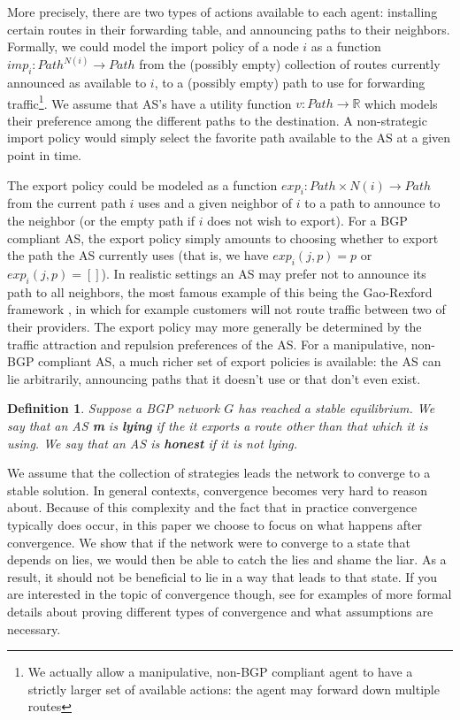 \documentclass[10pt]{article}
\newcommand{\R}{\mathbb{R}}
\newtheorem{definition}{Definition}
\begin{document}
    More precisely, there are two types of actions available to each agent:
    installing certain routes in their forwarding table,
    and announcing paths to their neighbors.
    Formally, we could model the import policy of a node $i$ as a function
    $imp_i : Path^{N(i)} \to Path$ from the (possibly empty) collection of
    routes currently announced as available to $i$, to a (possibly empty) path
    to use for forwarding traffic\footnote{
      We actually allow a manipulative, non-BGP compliant agent to have a
      strictly larger set of available actions: the agent may forward down
      multiple routes
    }. We assume that AS's have a utility function $v : Path \to \R$
    which models their preference among the different paths to the destination.
    A non-strategic import policy would simply select the favorite
    path available to the AS at a given point in time.

    The export policy could be modeled as a function
    $exp_i : Path\times N(i) \to Path$ from the current path $i$ uses and a
    given neighbor of $i$ to a path to announce to the neighbor (or the empty
    path if $i$ does not wish to export).
    For a BGP compliant AS, the export policy simply amounts to choosing whether
    to export the path the AS currently uses (that is, we have $exp_i(j, p) = p$ or
    $exp_i(j, p) = []$).
    In realistic settings an AS may prefer not to announce its path to all
    neighbors, the most famous example of this being the Gao-Rexford framework
    \cite{GaoRexford}, in which for example customers will not route traffic
    between two of their providers.
    The export policy may more generally be determined by the traffic attraction
    and repulsion preferences of the AS.
    For a manipulative, non-BGP compliant AS,
    a much richer set of export policies is available:
    the AS can lie arbitrarily, announcing paths that it doesn't use
    or that don't even exist.

    \begin{definition}
      Suppose a BGP network $G$ has reached a stable equilibrium.
      We say that an AS \textbf{m} is \textbf{lying} if the
      it exports a route other than that which it is using.
      We say that an AS is \textbf{honest} if it is not lying.
    \end{definition}

    We assume that the collection of strategies leads the network to converge to a
    stable solution.
    In general contexts, convergence becomes very hard to
    reason about. Because of this complexity and the fact that in practice
    convergence typically does occur,
    in this paper we choose to focus on what happens after
    convergence. We show that if the network were to converge to a state that
    depends on lies, we would then be able to catch the lies and shame the liar.
    As a result, it should not be beneficial to lie in a way that leads to that
    state.
    If you are interested in the topic of convergence though, see
    \cite{RoutingGames, GaoRexford, StablePaths, PolicyPathVector}
    for examples of more formal details about proving different types of convergence
    and what assumptions are necessary.
\end{document}
